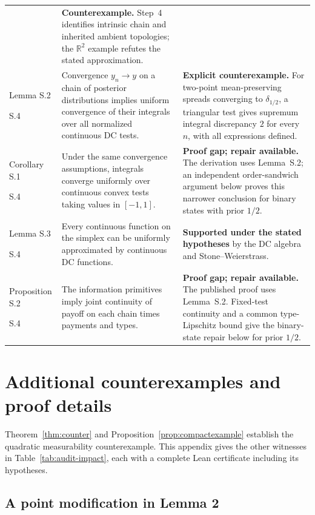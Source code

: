 \documentclass[11pt]{article}
\theoremstyle{remark}\newtheorem{remark}[theorem]{Remark}
\begin{document}
\begin{longtable}{@{}>{\raggedright\arraybackslash}p{2.60cm}>{\raggedright\arraybackslash}p{6.30cm}>{\raggedright\arraybackslash}p{6.45cm}@{}}
& \textbf{Counterexample.} Step~4 identifies intrinsic chain and inherited ambient topologies; the $\mathbb R^2$ example refutes the stated approximation. \\
Lemma S.2\par S.4
& Convergence $y_n\to y$ on a chain of posterior distributions implies uniform convergence of their integrals over all normalized continuous DC tests.
& \textbf{Explicit counterexample.} For two-point mean-preserving spreads converging to $\delta_{1/2}$, a triangular test gives supremum integral discrepancy $2$ for every $n$, with all expressions defined. \\
Corollary S.1\par S.4
& Under the same convergence assumptions, integrals converge uniformly over continuous convex tests taking values in $[-1,1]$.
& \textbf{Proof gap; repair available.} The derivation uses Lemma~S.2; an independent order-sandwich argument below proves this narrower conclusion for binary states with prior $1/2$. \\
Lemma S.3\par S.4
& Every continuous function on the simplex can be uniformly approximated by continuous DC functions.
& \textbf{Supported under the stated hypotheses} by the DC algebra and Stone--Weierstrass. \\
Proposition S.2\par S.4
& The information primitives imply joint continuity of payoff on each chain times payments and types.
& \textbf{Proof gap; repair available.} The published proof uses Lemma~S.2. Fixed-test continuity and a common type-Lipschitz bound give the binary-state repair below for prior $1/2$. \\
\end{longtable}
\endgroup
\FloatBarrier


\clearpage
\section{Additional counterexamples and proof details}\label{app:audit-witnesses}
Theorem~\ref{thm:counter} and Proposition~\ref{prop:compactexample}
establish the quadratic measurability counterexample.  This appendix
gives the other witnesses in Table~\ref{tab:audit-impact}, each with a
complete Lean certificate including its hypotheses.



\subsection{A point modification in Lemma 2}
\label{app:audit-spike}
\end{document}
